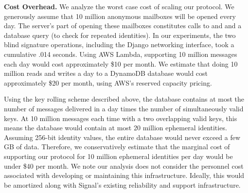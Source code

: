 \medskip \noindent
\textbf{Cost Overhead.}
We analyze the worst case cost of scaling our protocol. We generously assume that 10 million anonymous mailboxes will be opened every day.
The server's part of opening these mailboxes constitutes calls to 
\bsverify and \bssign and a database query (to check for repeated identities).
In our experiments, the
two blind signature operations, including the Django networking
interface, took a cumulative .014 seconds.  Using AWS Lambda, supporting 
10 million messages each day would cost approximately \$10 per month.  
We estimate that doing 10 million reads and writes a day to a DynamoDB database
would cost approximately \$20 per month, using AWS's reserved capacity pricing.

Using the key rolling scheme described above, the database contains
at most the number of messages delivered in a day times the number
of simultaneously valid keys. At 10 million messages each time with a
two overlapping valid keys, this means the database would contain at most 20 million
ephemeral identities.  Assuming  256-bit identity
values, the entire database would never exceed a few GB of data.
Therefore, we conservatively estimate that the
marginal cost of supporting our protocol for 10 million ephemeral identities per day
would be under \$40 per month.  We note our analysis does not consider the personnel cost associated with
developing or maintaining this infrastructure. Ideally, this would be
amortized along with Signal's existing reliability and support infrastructure.




